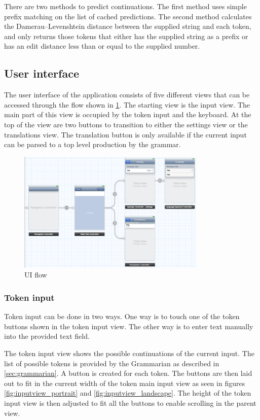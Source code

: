 There are two methods to predict continuations. The first method uses simple prefix matching on the list of cached predictions. The second method calculates the Damerau–Levenshtein distance between the supplied string and each token, and only returns those tokens that either has the supplied string as a prefix or has an edit distance less than or equal to the supplied number.

\subsection{User interface}
The user interface of the application consists of five different views that can be accessed through the flow shown in \ref{fig:storyboard}. The starting view is the input view. The main part of this view is occupied by the token input and the keyboard. At the top of the view are two buttons to transition to either the settings view or the translations view. The translation button is only available if the current input can be parsed to a top level production by the grammar.

\begin{figure}[htb]
\centering
\includegraphics[width=0.8\textwidth]{fig/storyboard}
\caption{UI flow}
\label{fig:storyboard}
\end{figure}


\subsubsection{Token input}
Token input can be done in two ways. One way is to touch one of the token buttons shown in the token input view. The other way is to enter text manually into the provided text field.

The token input view shows the possible continuations of the current input. The list of possible tokens is provided by the Grammarian as described in \ref{sec:grammarian}. A button is created for each token. The buttons are then laid out to fit in the current width of the token main input view as seen in figures \ref{fig:inputview_portrait} and \ref{fig:inputview_landscape}. The height of the token input view is then adjusted to fit all the buttons to enable scrolling in the parent view.

